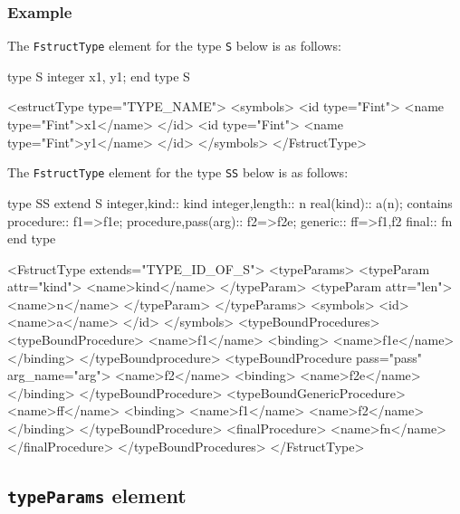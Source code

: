 \subsubsection*{Example}

The {\tt FstructType} element for the type {\tt S} below is as follows:
\vspace{2mm}

\begin{Fexample90}
type S
    integer x1, y1;
end type S
\end{Fexample90}
\vspace{1mm}

\begin{XcodeMLFExample}
<estructType type="TYPE_NAME">
  <symbols>
    <id type="Fint">
      <name type="Fint">x1</name>
    </id>
    <id type="Fint">
      <name type="Fint">y1</name>
    </id>
  </symbols>
</FstructType>
\end{XcodeMLFExample}

The {\tt FstructType} element for the type {\tt SS} below is as follows:
\vspace{2mm}

\begin{Fexample2008}
type SS extend S
	integer,kind:: kind
    integer,length:: n
    real(kind):: a(n);
contains
	procedure:: f1=>f1e;
	procedure,pass(arg):: f2=>f2e;
	generic:: ff=>f1,f2
	final:: fn
end type
\end{Fexample2008}
\vspace{1mm}

\begin{XcodeMLFExample}
<FstructType extends="TYPE_ID_OF_S">
  <typeParams>
    <typeParam attr="kind">
      <name>kind</name>
    </typeParam>
    <typeParam attr="len">
      <name>n</name>
    </typeParam>
  </typeParams>
  <symbols>
 <id>
      <name>a</name>
    </id>
  </symbols>
<typeBoundProcedures>
 <typeBoundProcedure>
      <name>f1</name>
	  <binding>
	     <name>f1e</name>
	  </binding>
    </typeBoundprocedure>
<typeBoundProcedure pass="pass" arg_name="arg">
      <name>f2</name>
	  <binding>
	      <name>f2e</name>
	  </binding>
    </typeBoundProcedure>
<typeBoundGenericProcedure>
  <name>ff</name>
  <binding>
        <name>f1</name>
<name>f2</name>
</binding>
    </typeBoundProcedure>
<finalProcedure>
      <name>fn</name>
    </finalProcedure>
  </typeBoundProcedures>
</FstructType>
\end{XcodeMLFExample}


\subsection{ {\tt typeParams} element}

